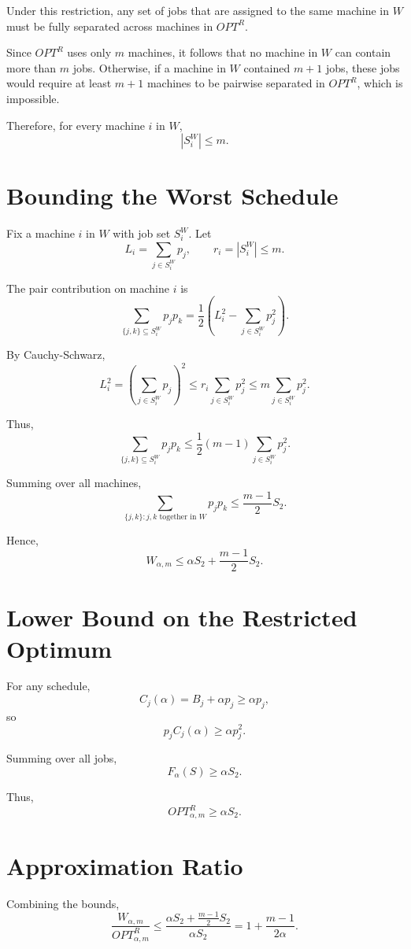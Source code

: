 \documentclass[11pt]{article}
\begin{document}
Under this restriction, any set of jobs that are assigned to the same machine in $W$ must be fully separated across machines in $OPT^R$.

Since $OPT^R$ uses only $m$ machines, it follows that no machine in $W$ can contain more than $m$ jobs. Otherwise, if a machine in $W$ contained $m+1$ jobs, these jobs would require at least $m+1$ machines to be pairwise separated in $OPT^R$, which is impossible.

Therefore, for every machine $i$ in $W$,
\[
|S_i^W| \le m.
\]

\section{Bounding the Worst Schedule}

Fix a machine $i$ in $W$ with job set $S_i^W$. Let
\[
L_i = \sum_{j \in S_i^W} p_j, \qquad r_i = |S_i^W| \le m.
\]

The pair contribution on machine $i$ is
\[
\sum_{\{j,k\} \subseteq S_i^W} p_j p_k
=
\frac{1}{2} \left( L_i^2 - \sum_{j \in S_i^W} p_j^2 \right).
\]

By Cauchy-Schwarz,
\[
L_i^2
=
\left( \sum_{j \in S_i^W} p_j \right)^2
\le
r_i \sum_{j \in S_i^W} p_j^2
\le
m \sum_{j \in S_i^W} p_j^2.
\]

Thus,
\[
\sum_{\{j,k\} \subseteq S_i^W} p_j p_k
\le
\frac{1}{2}(m-1)\sum_{j \in S_i^W} p_j^2.
\]

Summing over all machines,
\[
\sum_{\{j,k\}: j,k \text{ together in } W} p_j p_k
\le
\frac{m-1}{2} S_2.
\]

Hence,
\[
W_{\alpha,m}
\le
\alpha S_2 + \frac{m-1}{2} S_2.
\]

\section{Lower Bound on the Restricted Optimum}

For any schedule,
\[
C_j(\alpha) = B_j + \alpha p_j \ge \alpha p_j,
\]
so
\[
p_j C_j(\alpha) \ge \alpha p_j^2.
\]

Summing over all jobs,
\[
F_\alpha(S) \ge \alpha S_2.
\]

Thus,
\[
OPT_{\alpha,m}^R \ge \alpha S_2.
\]

\section{Approximation Ratio}

Combining the bounds,
\[
\frac{W_{\alpha,m}}{OPT_{\alpha,m}^R}
\le
\frac{\alpha S_2 + \frac{m-1}{2} S_2}{\alpha S_2}
=
1 + \frac{m-1}{2\alpha}.
\]
\end{document}
